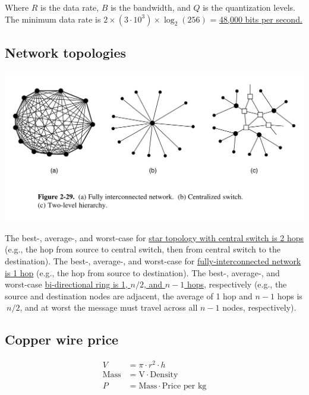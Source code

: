 Where $R$ is the data rate, $B$ is the bandwidth, and $Q$ is the quantization levels. The minimum data rate is $2 \times (3 \cdot 10^3) \times \log_2(256)$ = \ul{48,000 bits per second.}

\subsection{Network topologies}

\includegraphics[width=\the\columnwidth]{network-topologies.png}

The best-, average-, and worst-case for \ul{star topology with central switch is 2 hops} (e.g., the hop from source to central switch, then from central switch to the destination). The best-, average-, and worst-case for \ul{fully-interconnected network is 1 hop} (e.g., the hop from source to destination). The best-, average-, and worst-case \ul{bi-directional ring is 1, $n / 2$, and $n - 1$ hops}, respectively (e.g., the source and destination nodes are adjacent, the average of 1 hop and $n - 1$ hops is $~ n/2$, and at worst the message must travel across all $n - 1$ nodes, respectively).

\subsection{Copper wire price}
\begin{align*}
	V &= \pi \cdot r^2 \cdot h \\
	\text{Mass} &= \text{V} \cdot \text{Density} \\
	P &= \text{Mass} \cdot \text{Price per kg}
\end{align*}

